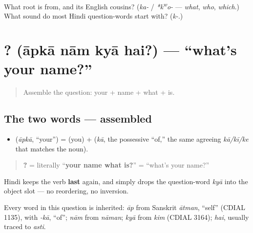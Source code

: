 \begin{tcolorbox}[breakable,colback=teal!4,colframe=teal!35!black,title={Before you move on}]
What root is \textbf{} from, and its English cousins? (\emph{ka-} / \emph{*k\textsuperscript{w}o-} — \emph{what}, \emph{who}, \emph{which}.) What sound do most Hindi question-words start with? (\emph{k-}.)
\end{tcolorbox}
\section[\texorpdfstring{\hi{आपका} \hi{नाम} \hi{क्या} \hi{है}? (āpkā nām kyā hai?)}{आपका नाम क्या है? (āpkā nām kyā hai?)}]{   ? (āpkā nām kyā hai?) — \textquotedblleft{}what's your name?\textquotedblright{}}

\label{lesson:HI-C02-aapka-naam-kya-hai}



\begin{quote}
Assemble the question: your + name + what + is.
\end{quote}

\subsection*{The two words — assembled}
\begin{itemize}
\raggedright
  \item \textbf{} (\emph{āpkā}, \textquotedblleft{}your\textquotedblright{}) = \textbf{} (you) + \textbf{} (\emph{kā}, the possessive \textquotedblleft{}of,\textquotedblright{} the same agreeing \emph{kā/kī/ke} that matches the noun).
\end{itemize}

\begin{quote}
\textbf{   ?} = literally \textquotedblleft{}\textbf{your name what is?}\textquotedblright{} = \textquotedblleft{}what's your name?\textquotedblright{}
\end{quote}

Hindi keeps the verb \textbf{last} again, and simply drops the question-word \emph{kyā} into the object slot — no reordering, no inversion.

\begin{cousinweb}
Every word in this question is inherited: \emph{āp} from Sanskrit \emph{ātman}, \textquotedblleft{}self\textquotedblright{} (CDIAL 1135), with \emph{-kā}, \textquotedblleft{}of\textquotedblright{}; \emph{nām} from \emph{nāman}; \emph{kyā} from \emph{kim} (CDIAL 3164); \emph{hai}, usually traced to \emph{asti}.
\end{cousinweb}


